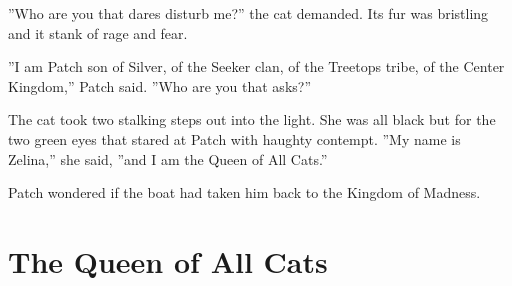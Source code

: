 \documentclass[12pt]{book}
\begin{document}
''Who are you that dares disturb me?'' the cat demanded. Its fur was bristling and it stank of rage and fear. \par
''I am Patch son of Silver, of the Seeker clan, of the Treetops tribe, of the Center Kingdom,'' Patch said. ''Who are you that asks?''\par
The cat took two stalking steps out into the light. She was all black but for the two green eyes that stared at Patch with haughty contempt. ''My name is Zelina,'' she said, ''and I am the Queen of All Cats.''\par
Patch wondered if the boat had taken him back to the Kingdom of Madness.\par

\section{The Queen of All Cats}
\end{document}
